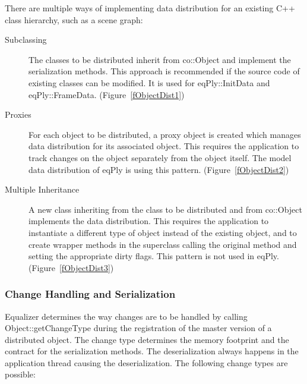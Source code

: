 \documentclass[10pt,a4]{scrartcl}
\newcommand{\fig}[1]{Figure~\ref{#1}}
\begin{document}
There are multiple ways of implementing data distribution for an
existing C++ class hierarchy, such as a scene graph:
\begin{description}
\item[Subclassing] The classes to be distributed inherit from
  \textsf{co::Object} and implement the serialization methods. This approach is
  recommended if the source code of existing classes can be modified. It is used
  for \textsf{eqPly::InitData} and
  \textsf{eqPly::FrameData}. (\fig{fObjectDist1})
\item[Proxies] For each object to be distributed, a proxy object is
  created which manages data distribution for its associated
  object. This requires the application to track changes on the object
  separately from the object itself. The model data distribution of
  eqPly is using this pattern. (\fig{fObjectDist2})
\item[Multiple Inheritance] A new class inheriting from the class to be
  distributed and from \textsf{co::Object} implements the data
  distribution. This requires the application to instantiate a different type of
  object instead of the existing object, and to create wrapper methods in the
  superclass calling the original method and setting the appropriate dirty
  flags. This pattern is not used in eqPly. (\fig{fObjectDist3})
\end{description}

\subsubsection{Change Handling and Serialization}

Equalizer determines the way changes are to be handled by calling
\textsf{Object::get\-Change\-Type} during the registration of the master version
of a distributed object. The change type determines the memory footprint and the
contract for the serialization methods. The deserialization always happens in
the application thread causing the deserialization. The following change types
are possible:
\end{document}
